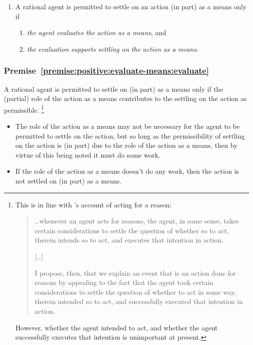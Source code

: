 \documentclass[10pt]{article}
\newcommand{\hozlinedash}[0]{%
  \noindent\hdashrule[0.5ex][c]{\textwidth}{.1pt}{2.5pt}
}
\begin{document}
\hozlinedash

\begin{enumerate}[label=P\arabic*., ref=(P\arabic*)]
\item\label{premise:positive:evaluate-means} A rational agent is permitted to settle on an action (in part) as a means only if
  \begin{enumerate}[label=P\arabic{enumi}\alph*., ref=(P\arabic{enumi}\alph*)]
  \item \emph{the agent evaluates the action as a means}, and
  \item \emph{the evaluation supports settling on the action as a means}.
  \end{enumerate}
\end{enumerate}

\hozlinedash


\subsubsection{Premise~\ref{premise:positive:evaluate-means:evaluate}}
\label{sec:premise:positive:evaluate-means:evaluate}

A rational agent is permitted to settle on (in part) as a means only if the (partial) role of the action as a means contributes to the settling on the action as permissible.\nolinebreak
\footnote{This is in line with \citeauthor{Hieronymi:2011aa}'s account of acting for a reason:
  \begin{quote}
    \dots whenever an agent acts for reasons, the agent, in some sense, takes certain considerations to settle the question of whether so to act, therein intends so to act, and executes that intention in action.
    \begin{center}
      [\dots]
    \end{center}
    I propose, then, that we explain an event that is an action done for reasons by appealing to the fact that the agent took certain considerations to settle the question of whether to act in some way, therein intended so to act, and successfully executed that intention in action.
    \cite[421]{Hieronymi:2011aa}
  \end{quote}
  However, whether the agent intended to act, and whether the agent successfully executes that intention is unimportant at present.
}

\begin{itemize}
\item The role of the action as a means may not be necessary for the agent to be permitted to settle on the action, but so long as the permissibility of settling on the action is (in part) due to the role of the action as a means, then by virtue of this being noted it must do some work.
\item If the role of the action as a means doesn't do any work, then the action is not settled on (in part) as a means.
\end{itemize}
\end{document}
